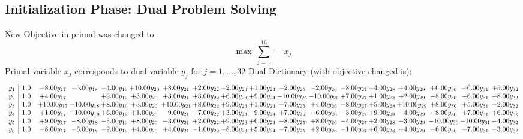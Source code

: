 \documentclass[9pt]{article}
\begin{document}
\subsection{Initialization Phase: Dual Problem Solving}
New Objective in primal was changed to : \[ \max\ \sum_{j=1}^{16}\ - x_j \] 
Primal variable $x_j$ corresponds to dual variable $y_j$ for $j = 1,\ldots,32$
Dual Dictionary (with objective changed is): 
\[\begin{array}{c| c c@{\hskip 2pt} c@{\hskip 2pt} c@{\hskip 2pt} c@{\hskip 2pt} c@{\hskip 2pt} c@{\hskip 2pt} c@{\hskip 2pt} c@{\hskip 2pt} c@{\hskip 2pt} c@{\hskip 2pt} c@{\hskip 2pt} c@{\hskip 2pt} c@{\hskip 2pt} c@{\hskip 2pt} c@{\hskip 2pt} c@{\hskip 2pt} }
 y_{1}   &  1.0 & -8.00 y_{17} & -5.00 y_{18} & -4.00 y_{19} & + 10.00 y_{20} & +  8.00 y_{21} & +  2.00 y_{22} & -2.00 y_{23} & +  1.00 y_{24} & -2.00 y_{25} & -2.00 y_{26} & -8.00 y_{27} & -4.00 y_{28} & +  4.00 y_{29} & +  6.00 y_{30} & -6.00 y_{31} & +  5.00 y_{32}\\
 y_{2}   &  1.0 & +  4.00 y_{17} &   & +  9.00 y_{19} & +  3.00 y_{20} & +  3.00 y_{21} & +  3.00 y_{22} & +  6.00 y_{23} & +  9.00 y_{24} & -10.00 y_{25} & -10.00 y_{26} & +  7.00 y_{27} & +  1.00 y_{28} & +  2.00 y_{29} & -8.00 y_{30} & -6.00 y_{31} & -8.00 y_{32}\\
 y_{3}   &  1.0 & + 10.00 y_{17} & -10.00 y_{18} & +  8.00 y_{19} & +  3.00 y_{20} & + 10.00 y_{21} & +  8.00 y_{22} & +  9.00 y_{23} & +  1.00 y_{24} & -7.00 y_{25} & +  4.00 y_{26} & -8.00 y_{27} & +  5.00 y_{28} & + 10.00 y_{29} & +  8.00 y_{30} & +  5.00 y_{31} & -2.00 y_{32}\\
 y_{4}   &  1.0 & +  1.00 y_{17} & -10.00 y_{18} & +  6.00 y_{19} & +  1.00 y_{20} & -9.00 y_{21} & -7.00 y_{22} & +  3.00 y_{23} & -9.00 y_{24} & +  7.00 y_{25} & -6.00 y_{26} & -3.00 y_{27} & +  9.00 y_{28} & -4.00 y_{29} & -8.00 y_{30} & +  7.00 y_{31} & +  6.00 y_{32}\\
 y_{5}   &  1.0 & +  9.00 y_{17} & -8.00 y_{18} & -3.00 y_{19} & +  8.00 y_{20} & -3.00 y_{21} & +  2.00 y_{22} & +  9.00 y_{23} & +  6.00 y_{24} & -8.00 y_{25} & +  8.00 y_{26} & -4.00 y_{27} & +  2.00 y_{28} & -3.00 y_{29} & -10.00 y_{30} & -10.00 y_{31} & -4.00 y_{32}\\
 y_{6}   &  1.0 & -8.00 y_{17} & -6.00 y_{18} & -2.00 y_{19} & +  4.00 y_{20} & +  4.00 y_{21} & -1.00 y_{22} & -8.00 y_{23} & +  5.00 y_{24} & -7.00 y_{25} & +  2.00 y_{26} & -1.00 y_{27} & +  6.00 y_{28} & +  4.00 y_{29} & -6.00 y_{30} & -7.00 y_{31} & -3.00 y_{32}\\

\end{array}\]
\end{document}
